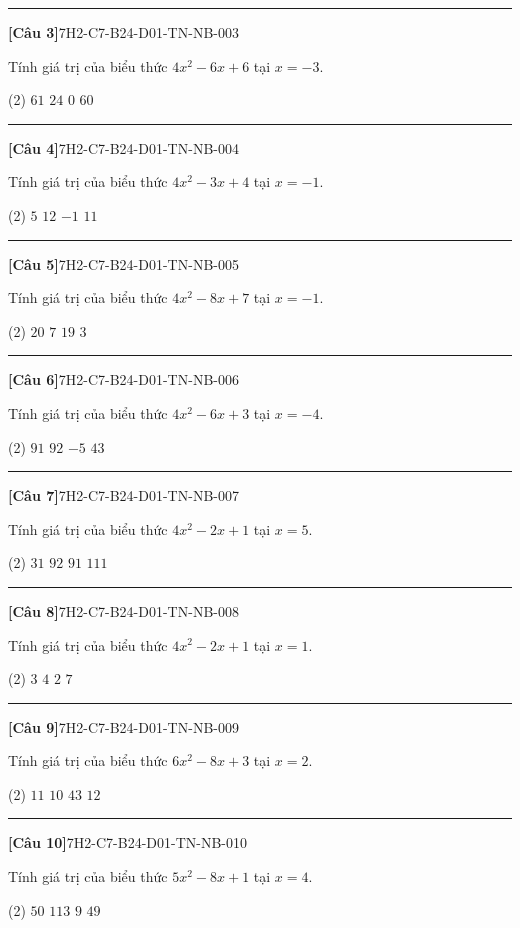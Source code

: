 \documentclass[12pt,a4paper]{article}
\newif\ifloigiai
\newenvironment{cauhoi}[2]{%
  \par\medskip\noindent\rule{\textwidth}{0.4pt}\par\nopagebreak
  \noindent\textbf{[#1]}\hfill{\scriptsize\ttfamily #2}\par\nopagebreak\smallskip}{\par}
\newcommand{\dapan}[1]{\ifloigiai\par\smallskip\noindent\textit{Đáp án:} \textbf{#1}\par\fi}
\begin{document}
\begin{cauhoi}{Câu 3}{7H2-C7-B24-D01-TN-NB-003}
Tính giá trị của biểu thức $4x^{2}-6x+6$ tại $x=-3$.
\begin{tasks}(2)
\task $61$
\task $24$
\task $0$
\task $60$
\end{tasks}
\dapan{D}
\end{cauhoi}
\begin{cauhoi}{Câu 4}{7H2-C7-B24-D01-TN-NB-004}
Tính giá trị của biểu thức $4x^{2}-3x+4$ tại $x=-1$.
\begin{tasks}(2)
\task $5$
\task $12$
\task $-1$
\task $11$
\end{tasks}
\dapan{D}
\end{cauhoi}
\begin{cauhoi}{Câu 5}{7H2-C7-B24-D01-TN-NB-005}
Tính giá trị của biểu thức $4x^{2}-8x+7$ tại $x=-1$.
\begin{tasks}(2)
\task $20$
\task $7$
\task $19$
\task $3$
\end{tasks}
\dapan{C}
\end{cauhoi}
\begin{cauhoi}{Câu 6}{7H2-C7-B24-D01-TN-NB-006}
Tính giá trị của biểu thức $4x^{2}-6x+3$ tại $x=-4$.
\begin{tasks}(2)
\task $91$
\task $92$
\task $-5$
\task $43$
\end{tasks}
\dapan{A}
\end{cauhoi}
\begin{cauhoi}{Câu 7}{7H2-C7-B24-D01-TN-NB-007}
Tính giá trị của biểu thức $4x^{2}-2x+1$ tại $x=5$.
\begin{tasks}(2)
\task $31$
\task $92$
\task $91$
\task $111$
\end{tasks}
\dapan{C}
\end{cauhoi}
\begin{cauhoi}{Câu 8}{7H2-C7-B24-D01-TN-NB-008}
Tính giá trị của biểu thức $4x^{2}-2x+1$ tại $x=1$.
\begin{tasks}(2)
\task $3$
\task $4$
\task $2$
\task $7$
\end{tasks}
\dapan{A}
\end{cauhoi}
\begin{cauhoi}{Câu 9}{7H2-C7-B24-D01-TN-NB-009}
Tính giá trị của biểu thức $6x^{2}-8x+3$ tại $x=2$.
\begin{tasks}(2)
\task $11$
\task $10$
\task $43$
\task $12$
\end{tasks}
\dapan{A}
\end{cauhoi}
\begin{cauhoi}{Câu 10}{7H2-C7-B24-D01-TN-NB-010}
Tính giá trị của biểu thức $5x^{2}-8x+1$ tại $x=4$.
\begin{tasks}(2)
\task $50$
\task $113$
\task $9$
\task $49$
\end{tasks}
\dapan{D}
\end{cauhoi}
\end{document}
